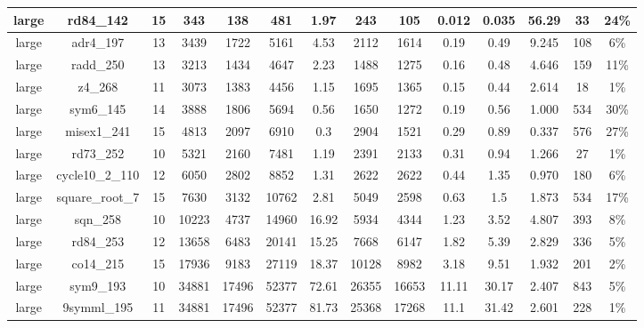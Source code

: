 \documentclass[journal,10pt,twocolumn]{IEEEtran}
\begin{document}
\begin{table}[!t]
{\begin{tabular}{|c|c|c|c|c|c|c|c|c|c|c|c|c|c|}
 \hline
 large&   rd84\_142 & 15    & 343   & 138   & 481   & 1.97  & 243   & 105   & 0.012 & 0.035 & 56.29 & 33    & 24\% \\
    \hline
  large&   adr4\_197 & 13    & 3439  & 1722  & 5161  & 4.53  & 2112  & 1614  & 0.19  & 0.49  & 9.245 & 108   & 6\% \\
    \hline
  large&   radd\_250 & 13    & 3213  & 1434  & 4647  & 2.23  & 1488  & 1275  & 0.16  & 0.48  & 4.646 & 159   & 11\% \\
    \hline
   large&  z4\_268 & 11    & 3073  & 1383  & 4456  & 1.15  & 1695  & 1365  & 0.15  & 0.44  & 2.614 & 18    & 1\% \\
    \hline
    large& sym6\_145 & 14    & 3888  & 1806  & 5694  & 0.56  & 1650  & 1272  & 0.19  & 0.56  & 1.000     & 534   & 30\% \\
    \hline
   large&  misex1\_241 & 15    & 4813  & 2097  & 6910  & 0.3   & 2904  & 1521  & 0.29  & 0.89  & 0.337 & 576   & 27\% \\
    \hline
   large&  rd73\_252 & 10    & 5321  & 2160  & 7481  & 1.19  & 2391  & 2133  & 0.31  & 0.94  & 1.266 & 27    & 1\% \\
    \hline
    large& cycle10\_2\_110 & 12    & 6050  & 2802  & 8852  & 1.31  & 2622  & 2622  & 0.44  & 1.35  & 0.970 & 180   & 6\% \\
    \hline
   large&  square\_root\_7 & 15    & 7630  & 3132  & 10762 & 2.81  & 5049  & 2598  & 0.63  & 1.5   & 1.873& 534   & 17\% \\
    \hline
   large&  sqn\_258 & 10    & 10223 & 4737  & 14960 & 16.92 & 5934  & 4344  & 1.23  & 3.52  & 4.807 & 393   & 8\% \\
    \hline
   large&  rd84\_253 & 12    & 13658 & 6483  & 20141 & 15.25 & 7668  & 6147  & 1.82  & 5.39  & 2.829 & 336   & 5\% \\
    \hline
 large&    co14\_215 & 15    & 17936 & 9183  & 27119 & 18.37 & 10128 & 8982  & 3.18  & 9.51  & 1.932 & 201   & 2\% \\
    \hline
  large&   sym9\_193 & 10    & 34881 & 17496 & 52377 & 72.61 & 26355 & 16653 & 11.11 & 30.17 & 2.407 & 843   & 5\% \\
  \hline
   large&  9symml\_195 & 11    & 34881 & 17496 & 52377 & 81.73 & 25368 & 17268 & 11.1  & 31.42 & 2.601 & 228   & 1\% \\
    \hline
    \end{tabular}
}%
    

\end{table}
\end{document}
